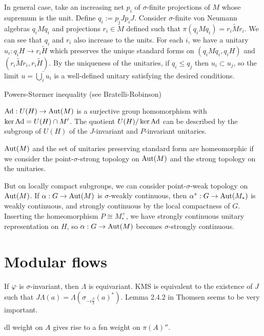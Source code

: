 \documentclass{../../large}
\begin{document}
\begin{pf}
In general case, take an increasing net $p_i$ of $\sigma$-finite projections of $M$ whose supremum is the unit.
Define $q_i:=p_iJp_iJ$.
Consider $\sigma$-finite von Neumann algebras $q_iMq_i$ and projections $r_i\in\tilde M$ defined such that $\pi(q_iMq_i)=r_i\tilde Mr_i$.
We can see that $q_i$ and $r_i$ also increase to the units.
For each $i$, we have a unitary $u_i:q_iH\to r_i\tilde H$ which preserves the unique standard forms on $(q_iMq_i,q_iH)$ and $(r_i\tilde M r_i,r_i\tilde H)$.
By the uniqueness of the unitaries, if $q_i\le q_j$ then $u_i\subset u_j$, so the limit $u=\bar{\bigcup_iu_i}$ is a well-defined unitary satisfying the desired conditions.
\end{pf}

\begin{prb}
Powers-St\o rmer inequality (see Bratelli-Robinson)

$\operatorname{Ad}:U(H)\to\operatorname{Aut}(M)$ is a surjective group homomorphism with $\ker\operatorname{Ad}=U(H)\cap M'$.
The quotient $U(H)/\ker\operatorname{Ad}$ can be described by the subgroup of $U(H)$ of the $J$-invariant and $P$-invariant unitaries.

$\operatorname{Aut}(M)$ and the set of unitaries preserving standard form are homeomorphic if we consider the point-$\sigma$-strong topology on $\operatorname{Aut}(M)$ and the strong topology on the unitaries.

But on locally compact subgroups, we can consider point-$\sigma$-weak topology on $\operatorname{Aut}(M)$.
If $\alpha:G\to\operatorname{Aut}(M)$ is $\sigma$-weakly continuous, then $\alpha^*:G\to\operatorname{Aut}(M_*)$ is weakly continuous, and strongly continuous by the local compactness of $G$.
Inserting the homeomorphism $P\cong M_*^+$, we have strongly continuous unitary representation on $H$, so $\alpha:G\to\operatorname{Aut}(M)$ becomes $\sigma$-strongly continuous.

\end{prb}





\section{Modular flows}

If $\varphi$ is $\sigma$-invariant, then $\Lambda$ is equivariant.
KMS is equivalent to the existence of $J$ such that $J\Lambda(a)=\Lambda(\sigma_{-i\frac\beta2}(a)^*)$.
Lemma 2.4.2 in Thomsen seems to be very important.

dl weight on $A$ gives rise to a fsn weight on $\pi(A)''$.
\end{document}
